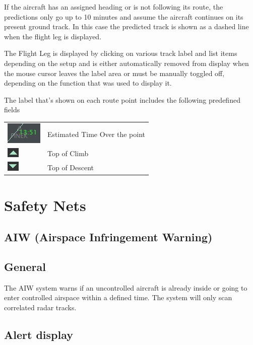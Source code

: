 \documentclass[11pt,a4paper]{memoir}
\begin{document}
If the aircraft has an assigned heading or is not following its route, the predictions only go up to 10 minutes
and assume the aircraft continues on its present ground track. In this case the predicted track is shown as a
dashed line when the flight leg is displayed.

The Flight Leg is displayed by clicking on various track label and list items depending on the setup and is
either automatically removed from display when the mouse cursor leaves the label area or must be
manually toggled off, depending on the function that was used to display it.

The label that’s shown on each route point includes the following predefined fields

\begin{tabular}{l l}
\includegraphics{img/fleto.png}     & Estimated Time Over the point\\
\includegraphics{img/fltoc.png}   & Top of Climb\\
\includegraphics{img/fltod.png}   & Top of Descent\\
\end{tabular}

\section{Safety Nets}

\subsection{AIW (Airspace Infringement Warning)}

\subsection*{General}

The AIW system warns if an uncontrolled aircraft is already inside or going to enter controlled airspace within a defined time. The system will only scan correlated radar tracks.

\subsection*{Alert display}
\end{document}
